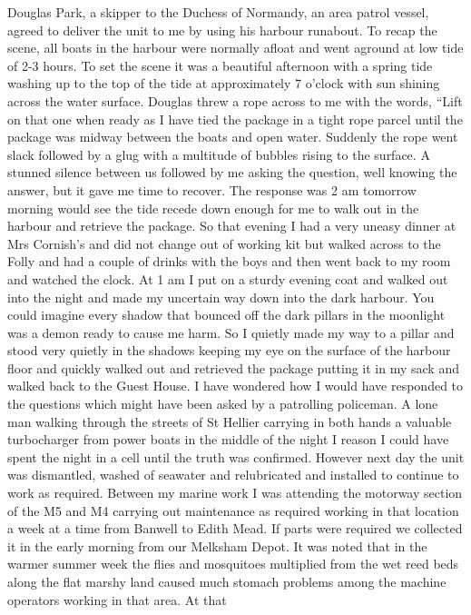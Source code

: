 Douglas Park, a skipper to the Duchess of Normandy, an area patrol vessel,
agreed to deliver the unit to me by using his harbour runabout. To recap the
scene, all boats in the harbour were normally afloat and went aground at low
tide of 2-3 hours. To set the scene it was a beautiful afternoon with a spring
tide washing up to the top of the tide at approximately 7 o'clock with sun
shining across the water surface. Douglas threw a rope across to me with the
words, ``Lift on that one when ready as I have tied the package in a tight rope
parcel until the package was midway between the boats and open water. Suddenly
the rope went slack followed by a glug with a multitude of bubbles rising to
the surface. A stunned silence between us followed by me asking the question,
well knowing the answer, but it gave me time to recover. The response was 2 am
tomorrow morning would see the tide recede down enough for me to walk out in
the harbour and retrieve the package. So that evening I had a very uneasy
dinner at Mrs Cornish's and did not change out of working kit but walked across
to the Folly and had a couple of drinks with the boys and then went back to my
room and watched the clock. At 1 am I put on a sturdy evening coat and walked
out into the night and made my uncertain way down into the dark harbour. You
could imagine every shadow that bounced off the dark pillars in the moonlight
was a demon ready to cause me harm. So I quietly made my way to a pillar and
stood very quietly in the shadows keeping my eye on the surface of the harbour
floor and quickly walked out and retrieved the package putting it in my sack
and walked back to the Guest House. I have wondered how I would have responded
to the questions which might have been asked by a patrolling policeman. A lone
man walking through the streets of St Hellier carrying in both hands a valuable
turbocharger from power boats in the middle of the night I reason I could have
spent the night in a cell until the truth was confirmed. However next day the
unit was dismantled, washed of seawater and relubricated and installed to
continue            to work as required. Between my marine work I
was attending the motorway section of the M5 and M4 carrying out maintenance as
required working in that location a week at a time from Banwell to Edith Mead.
If parts were required we collected it in the early morning from our Melksham
Depot. It was noted that in the warmer summer week the flies and mosquitoes
multiplied from the wet reed beds along the flat marshy land caused much
stomach problems among the machine operators working in that area. At that
